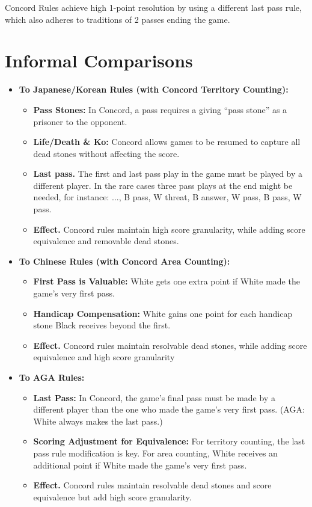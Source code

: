 \documentclass[11pt]{article}
\begin{document}
Concord Rules achieve high 1-point resolution by using a different last pass rule, which also adheres to traditions of 2 passes ending the game.

\newpage

\section{Informal Comparisons}

\begin{itemize}
\item \textbf{To Japanese/Korean Rules (with Concord Territory Counting):}
    \begin{itemize}
    \item \textbf{Pass Stones:} In Concord, a pass requires a giving ``pass stone'' as a prisoner to the opponent.
    \item \textbf{Life/Death \& Ko:} Concord allows games to be resumed to capture all dead stones without affecting the score.
    \item \textbf{Last pass.} The first and last pass play in the game must be played by a different player.
    In the rare cases three pass plays at the end might be needed, for instance: ..., B pass, W threat, B answer, W pass, B pass, W pass.
    \item \textbf{Effect.} Concord rules maintain high score granularity, while adding score equivalence and removable dead stones.
    \end{itemize}

\item \textbf{To Chinese Rules (with Concord Area Counting):}
    \begin{itemize}
    \item \textbf{First Pass is Valuable:} White gets one extra point if White made the game's very first pass.
    \item \textbf{Handicap Compensation:} White gains one point for each handicap stone Black receives beyond the first.
    \item \textbf{Effect.} Concord rules maintain resolvable dead stones, while adding score equivalence and high score granularity
    \end{itemize}

\item \textbf{To AGA Rules:}
    \begin{itemize}
    \item \textbf{Last Pass:} In Concord, the game's final pass must be made by a different player than the one who made the game's very first pass.
    (AGA: White always makes the last pass.)
    \item \textbf{Scoring Adjustment for Equivalence:} For territory counting, the last pass rule modification is key.
    For area counting, White receives an additional point if White made the game's very first pass.
    \item \textbf{Effect.} Concord rules maintain resolvable dead stones and score equivalence but add high score granularity.
    \end{itemize}
\end{itemize}
\end{document}
